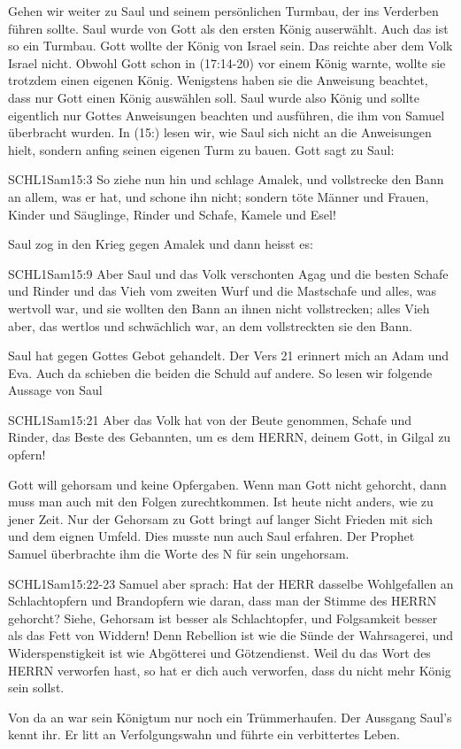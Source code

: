 \documentclass[14pt]{../../inc/mybib}
\newenvironment{block}[1][]{%
  \vspace{1.5em}%
  \noindent\textbf{#1}\par%
  \vspace{0.0em}%
}{%
  \vspace{1em}%
}
\begin{document}
\begin{block}
    Gehen wir weiter zu Saul und seinem persönlichen Turmbau, der ins Verderben führen sollte. Saul wurde von Gott als den ersten König auserwählt. Auch das ist so ein Turmbau. Gott wollte der König von Israel sein. Das reichte aber dem Volk Israel nicht. Obwohl Gott schon in (17:14-20) vor einem König warnte, wollte sie trotzdem einen eigenen König. Wenigstens haben sie die Anweisung beachtet, dass nur Gott einen König auswählen soll. Saul wurde also König und sollte eigentlich nur Gottes Anweisungen beachten und ausführen, die ihm von Samuel überbracht wurden. In (15:) lesen wir, wie Saul sich nicht an die Anweisungen hielt, sondern anfing seinen eigenen Turm zu bauen. Gott sagt zu Saul:
    \begin{bibelbox}{SCHL}{1Sam}{15:3}
        So ziehe nun hin und schlage Amalek, und vollstrecke den Bann an allem, was er hat, und schone ihn nicht; sondern töte Männer und Frauen, Kinder und Säuglinge, Rinder und Schafe, Kamele und Esel!
    \end{bibelbox}
    Saul zog in den Krieg gegen Amalek und dann heisst es:
    \begin{bibelbox}{SCHL}{1Sam}{15:9}
        Aber Saul und das Volk verschonten Agag und die besten Schafe und Rinder und das Vieh vom zweiten Wurf und die Mastschafe und alles, was wertvoll war, und sie wollten den Bann an ihnen nicht vollstrecken; alles Vieh aber, das wertlos und schwächlich war, an dem vollstreckten sie den Bann.
    \end{bibelbox}
    Saul hat gegen Gottes Gebot gehandelt. Der Vers 21 erinnert mich an Adam und Eva. Auch da schieben die beiden die Schuld auf andere. So lesen wir folgende Aussage von Saul
    \begin{bibelbox}{SCHL}{1Sam}{15:21}
        Aber das Volk hat von der Beute genommen, Schafe und Rinder, das Beste des Gebannten, um es dem HERRN, deinem Gott, in Gilgal zu opfern!
    \end{bibelbox}
    Gott will gehorsam und keine Opfergaben. Wenn man Gott nicht gehorcht, dann muss man auch mit den Folgen zurechtkommen. Ist heute nicht anders, wie zu jener Zeit. Nur der Gehorsam zu Gott bringt auf langer Sicht Frieden mit sich und dem eignen Umfeld. Dies musste nun auch Saul erfahren. Der Prophet Samuel überbrachte ihm die Worte des \herr N für sein ungehorsam.    
    \begin{bibelbox}{SCHL}{1Sam}{15:22-23}
        Samuel aber sprach: Hat der HERR dasselbe Wohlgefallen an Schlachtopfern und Brandopfern wie daran, dass man der Stimme des HERRN gehorcht? Siehe, Gehorsam ist besser als Schlachtopfer, und Folgsamkeit besser als das Fett von Widdern! Denn Rebellion ist wie die Sünde der Wahrsagerei, und Widerspenstigkeit ist wie Abgötterei und Götzendienst. Weil du das Wort des HERRN verworfen hast, so hat er dich auch verworfen, dass du nicht mehr König sein sollst.
    \end{bibelbox} 
    Von da an war sein Königtum nur noch ein Trümmerhaufen. Der Aussgang Saul's kennt ihr. Er litt an Verfolgungswahn und führte ein verbittertes Leben.
\end{block}
\end{document}
